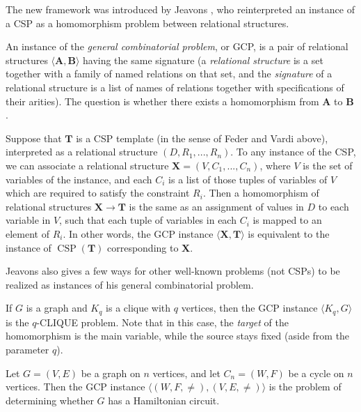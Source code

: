 \documentclass[letterpaper,11pt]{article}
\DeclareMathOperator{\CSP}{CSP}
\begin{document}
The new framework was introduced by Jeavons \cite{jeavons}, who reinterpreted an instance of a CSP as a homomorphism problem between relational structures.

\begin{defn} An instance of the \emph{general combinatorial problem}, or GCP, is a pair of relational structures $\langle \mathbf{A},\mathbf{B}\rangle$ having the same signature (a \emph{relational structure} is a set together with a family of named relations on that set, and the \emph{signature} of a relational structure is a list of names of relations together with specifications of their arities). The question is whether there exists a homomorphism from $\mathbf{A}$ to $\mathbf{B}$.
\end{defn}

\begin{ex} Suppose that $\mathbf{T}$ is a CSP template (in the sense of Feder and Vardi above), interpreted as a relational structure $(D, R_1, ..., R_n)$. To any instance of the CSP, we can associate a relational structure $\mathbf{X} = (V, C_1, ..., C_n)$, where $V$ is the set of variables of the instance, and each $C_i$ is a list of those tuples of variables of $V$ which are required to satisfy the constraint $R_i$. Then a homomorphism of relational structures $\mathbf{X} \rightarrow \mathbf{T}$ is the same as an assignment of values in $D$ to each variable in $V$, such that each tuple of variables in each $C_i$ is mapped to an element of $R_i$. In other words, the GCP instance $\langle \mathbf{X}, \mathbf{T}\rangle$ is equivalent to the instance of $\CSP(\mathbf{T})$ corresponding to $\mathbf{X}$.
\end{ex}

Jeavons also gives a few ways for other well-known problems (not CSPs) to be realized as instances of his general combinatorial problem.

\begin{ex} If $G$ is a graph and $K_q$ is a clique with $q$ vertices, then the GCP instance $\langle K_q, G\rangle$ is the $q$-CLIQUE problem. Note that in this case, the \emph{target} of the homomorphism is the main variable, while the source stays fixed (aside from the parameter $q$).
\end{ex}

\begin{ex} Let $G = (V,E)$ be a graph on $n$ vertices, and let $C_n = (W,F)$ be a cycle on $n$ vertices. Then the GCP instance $\langle (W,F,\ne), (V,E,\ne)\rangle$ is the problem of determining whether $G$ has a Hamiltonian circuit.
\end{ex}
\end{document}
